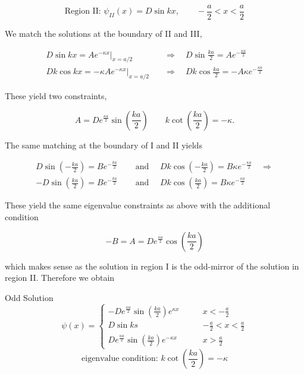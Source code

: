 \[
  \text{Region II: } \psi_{II}(x) = D\sin kx, \qquad -\frac{a}{2}
  < x < \frac{a}{2} 
\] \vspace{3px}

We match the solutions at the boundary of II and III, 

\begin{align} \label{}
  D\sin kx = Ae^{-\kappa x}\Big|_{x = a/2} \quad &\Rightarrow \quad D \sin
  \frac{ka}{2} = Ae^{-\frac{\kappa a}{2}} \\ Dk\cos kx = -\kappa Ae^{-\kappa
x}\Big|_{x = a/2} \quad &\Rightarrow \quad Dk\cos \frac{ka}{2} = -A\kappa
e^{-\frac{\kappa a}{2}}
\end{align}\vspace{3px}

These yield two constraints, 

\[
  A = De^{\frac{\kappa a}{2}} \sin \left( \frac{ka}{2} \right) \qquad k\cot
  \left( \frac{ka}{2} \right) = -\kappa.
\] \vspace{3px}

The same matching at the boundary of I and II yields 

\begin{align}
  D\sin \left( -\frac{ka}{2} \right) = Be^{-\frac{ka}{2}} \quad &\text{ and
  } \quad Dk \cos \left( -\frac{ka}{2} \right) = B\kappa e^{-\frac{\kappa
  a}{2}} \quad \Rightarrow \\ -D \sin \left( \frac{ka}{2} \right)
  = Be^{-\frac{ka}{2}} \quad &\text{ and } \quad Dk\cos \left( \frac{ka}{2}
  \right) = B\kappa e^{-\frac{\kappa a}{2}}     
\end{align} \vspace{3px}

These yield the same eigenvalue constraints as above with the additional
condition

\[
  -B = A = De^{\frac{\kappa a}{2}}\cos \left( \frac{ka}{2} \right)  
\] \vspace{3px}

which makes sense as the solution in region I is the odd-mirror of the solution
in region II. Therefore we obtain

\begin{mainbox}{Odd Solution}
  \[
  \psi(x) = \begin{cases}
    -De^{\frac{\kappa a}{2}} \sin \left( \frac{ka}{2} \right) e^{\kappa x}
    \qquad &x < -\frac{a}{2} \\ D\sin ks \qquad &-\frac{a}{2} < x < \frac{a}{2}
    \\ De^{\frac{\kappa a}{2}} \sin \left( \frac{ka}{2} \right) e^{-\kappa x}
    \qquad & x>\frac{a}{2} 
  \end{cases} 
  \] 
  \[ \text{eigenvalue condition: } k \cot \left( \frac{ka}{2} \right) = -\kappa
  \]
\end{mainbox}

